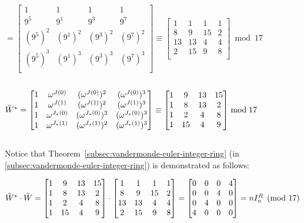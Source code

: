 $ = \begin{bmatrix}
1 & 1 & 1 & 1\\
9^{5} & 9^{1} & 9^{3} & 9^{7}\\
(9^{5})^2 & (9^{1})^2 & (9^{3})^2 & (9^{7})^2\\
(9^{5})^3 & (9^{1})^3 & (9^{3})^3 & (9^{7})^3\\
\end{bmatrix} \equiv \begin{bmatrix}
1 & 1 & 1 & 1\\
8 & 9 & 15 & 2\\
13 & 13 & 4 & 4\\
2 & 15 & 9 & 8\\
\end{bmatrix} \bmod{17}$ 

$ $ 

$\tilde{W}^* = \begin{bmatrix}
1 & \omega^{J(0)} & (\omega^{J(0)})^2 & (\omega^{J(0)})^3\\
1 & \omega^{J(1)} & (\omega^{J(1)})^2 & (\omega^{J(1)})^3\\
1 & \omega^{J_*(0)} & (\omega^{J_*(0)})^2 & (\omega^{J_*(0)})^3\\
1 & \omega^{J_*(1)} & (\omega^{J_*(1)})^2 & (\omega^{J_*(1)})^3\\
\end{bmatrix} \equiv \begin{bmatrix}
1 & 9 & 13 & 15\\
1 & 8 & 13 & 2\\
1 & 2 & 4 & 8\\
1 & 15 & 4 & 9\\
\end{bmatrix}  \bmod{17}$

$ $

Notice that Theorem~\ref*{subsec:vandermonde-euler-integer-ring} (in \autoref{subsec:vandermonde-euler-integer-ring}) is demonstrated as follows:

$\tilde{W}^* \cdot \tilde{W} = \begin{bmatrix}
1 & 9 & 13 & 15\\
1 & 8 & 13 & 2\\
1 & 2 & 4 & 8\\
1 & 15 & 4 & 9\\
\end{bmatrix} \cdot \begin{bmatrix}
1 & 1 & 1 & 1\\
8 & 9 & 15 & 2\\
13 & 13 & 4 & 4\\
2 & 15 & 9 & 8\\
\end{bmatrix} = \begin{bmatrix}
0 & 0 & 0 & 4\\
0 & 0 & 4 & 0\\
0 & 4 & 0 & 0\\
4 & 0 & 0 & 0\\
\end{bmatrix} = n I_n^{R} \pmod{17}$

